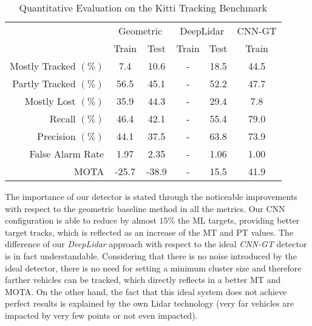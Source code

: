 \documentclass[letterpaper, 10 pt, conference]{ieeeconf}  %
\begin{document}
\begin{table}[]
\centering
\caption{Quantitative Evaluation on the Kitti Tracking Benchmark}
\label{tab:results}
\begin{tabular}{r||c|c||c|c||c||}
\multicolumn{1}{l||}{} & \multicolumn{2}{c||}{Geometric}                         & \multicolumn{2}{c||}{DeepLidar}                          & \multicolumn{1}{c||}{CNN-GT}                            \\ %
\multicolumn{1}{l||}{} & \multicolumn{1}{c|}{Train} & \multicolumn{1}{c||}{Test} & \multicolumn{1}{c|}{Train} & \multicolumn{1}{c||}{Test} & \multicolumn{1}{c||}{Train} \\ \hline \hline
Mostly Tracked $(\%)$  &   7.4    	&    10.6   	&   -  &    18.5    &    44.5  \\ %
Partly Tracked $(\%)$  &   56.5    	&    45.1   	&   -  &    52.2    &    47.7  \\ %
Mostly Lost  $(\%)$    &   35.9    	&    44.3		&   -  &    29.4    &    7.8  \\ \hline
Recall      $(\%)$     &   46.4   	&    42.1   	&   -  &    55.4    &    79.0  \\ %
Precision   $(\%)$     &   44.1    	&    37.5   	&   -  &    63.8    &    73.9  \\ %
False Alarm Rate 	   &   1.97    	&    2.35   	&   -  &    1.06    &    1.00  \\ \hline
MOTA             	   &  -25.7		&   -38.9   	&   -  &    15.5    &    41.9  \\ \hline

\end{tabular}
\end{table}
The importance of our detector is stated through the noticeable improvements with respect to the geometric baseline method in all the metrics. Our CNN configuration is able to reduce by almost $15\%$ the ML targets, providing better target tracks, which is reflected as an increase of the MT and PT values.
%
The difference of our \textit{DeepLidar} approach with respect to the ideal \textit{CNN-GT} detector is in fact understandable. Considering that there is no noise introduced by the ideal detector, there is no need for setting a minimum cluster size and therefore farther vehicles can be tracked, which directly reflects in a better MT and MOTA.  
On the other hand, the fact that this ideal system does not achieve perfect results is explained by the own Lidar technology (very far vehicles are impacted by very few points or not even impacted). 
\end{document}

